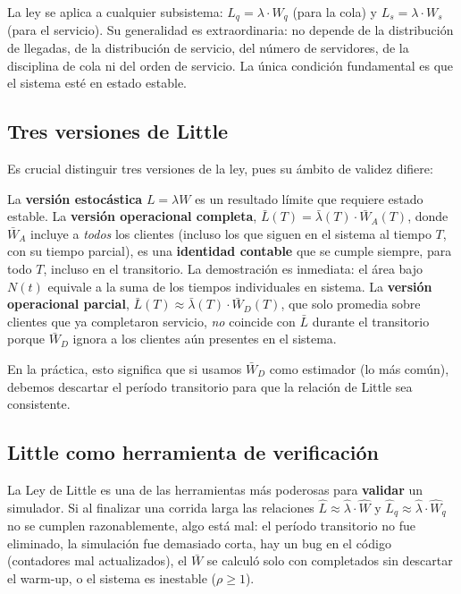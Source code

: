 \documentclass[11pt, letterpaper]{article}
\begin{document}
La ley se aplica a cualquier subsistema: $L_q = \lambda \cdot W_q$ (para la cola) y $L_s = \lambda \cdot W_s$ (para el servicio). Su generalidad es extraordinaria: no depende de la distribución de llegadas, de la distribución de servicio, del número de servidores, de la disciplina de cola ni del orden de servicio. La única condición fundamental es que el sistema esté en estado estable.

\subsection{Tres versiones de Little}

Es crucial distinguir tres versiones de la ley, pues su ámbito de validez difiere:

La \textbf{versión estocástica} $L = \lambda W$ es un resultado límite que requiere estado estable. La \textbf{versión operacional completa}, $\bar{L}(T) = \bar{\lambda}(T) \cdot \bar{W}_A(T)$, donde $\bar{W}_A$ incluye a \emph{todos} los clientes (incluso los que siguen en el sistema al tiempo $T$, con su tiempo parcial), es una \textbf{identidad contable} que se cumple siempre, para todo $T$, incluso en el transitorio. La demostración es inmediata: el área bajo $N(t)$ equivale a la suma de los tiempos individuales en sistema. La \textbf{versión operacional parcial}, $\bar{L}(T) \approx \bar{\lambda}(T) \cdot \bar{W}_D(T)$, que solo promedia sobre clientes que ya completaron servicio, \emph{no} coincide con $\bar{L}$ durante el transitorio porque $\bar{W}_D$ ignora a los clientes aún presentes en el sistema.

En la práctica, esto significa que si usamos $\bar{W}_D$ como estimador (lo más común), debemos descartar el período transitorio para que la relación de Little sea consistente.

\subsection{Little como herramienta de verificación}

La Ley de Little es una de las herramientas más poderosas para \textbf{validar} un simulador. Si al finalizar una corrida larga las relaciones $\hat{L} \approx \hat{\lambda}\cdot\hat{W}$ y $\hat{L}_q \approx \hat{\lambda}\cdot\hat{W}_q$ no se cumplen razonablemente, algo está mal: el período transitorio no fue eliminado, la simulación fue demasiado corta, hay un bug en el código (contadores mal actualizados), el $\bar{W}$ se calculó solo con completados sin descartar el warm-up, o el sistema es inestable ($\rho \geq 1$).
\end{document}
